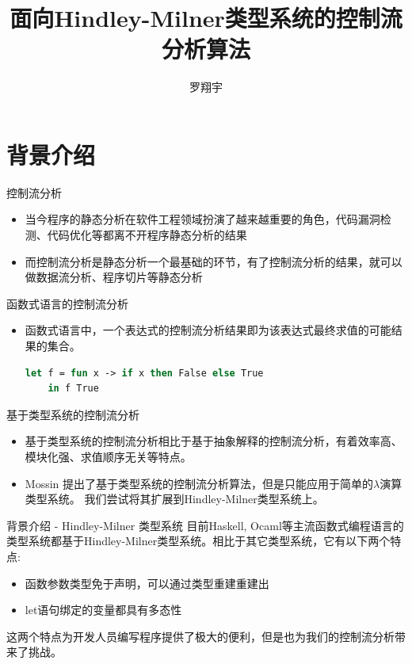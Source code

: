 \documentclass[9pt]{beamer}
\title{面向Hindley-Milner类型系统的控制流分析算法}
\author[Xiangyu Luo]{罗翔宇}
\institute[sist]{北京大学\\信息科学技术学院}
\begin{document}
    \begin{frame}
        \titlepage
    \end{frame}
    
    \section{背景介绍}
    \begin{frame}{控制流分析}
        \begin{itemize}
        		\item 当今程序的静态分析在软件工程领域扮演了越来越重要的角色，代码漏洞检测、代码优化等都离不开程序静态分析的结果
		\vspace{0.8em}
		\item 而控制流分析是静态分析一个最基础的环节，有了控制流分析的结果，就可以做数据流分析、程序切片等静态分析
        \end{itemize}
    \end{frame}
    
\begin{frame}[fragile]{函数式语言的控制流分析}
    	\begin{itemize}
		\item 函数式语言中，一个表达式的控制流分析结果即为该表达式最终求值的可能结果的集合。
        \begin{lstlisting}[language=Ocaml]
	let f = fun x -> if x then False else True
	in f True
        \end{lstlisting}
        \end{itemize}
\end{frame}
    
\begin{frame}{基于类型系统的控制流分析}
	\begin{itemize}
		\item 基于类型系统的控制流分析相比于基于抽象解释的控制流分析，有着效率高、模块化强、求值顺序无关等特点。
		\vspace{0.8em}
		\item Mossin 提出了基于类型系统的控制流分析算法，但是只能应用于简单的$\lambda$演算类型系统。 我们尝试将其扩展到Hindley-Milner类型系统上。
	\end{itemize}
\end{frame}

\begin{frame}{背景介绍 - Hindley-Milner 类型系统}
	目前Haskell, Ocaml等主流函数式编程语言的类型系统都基于Hindley-Milner类型系统。相比于其它类型系统，它有以下两个特点:
	\vspace{1.5em}
	\begin{itemize}
		\item 函数参数类型免于声明，可以通过类型重建重建出
		\item let语句绑定的变量都具有多态性
	\end{itemize}
	\vspace{1.5em}
	这两个特点为开发人员编写程序提供了极大的便利，但是也为我们的控制流分析带来了挑战。
\end{frame}
\end{document}
